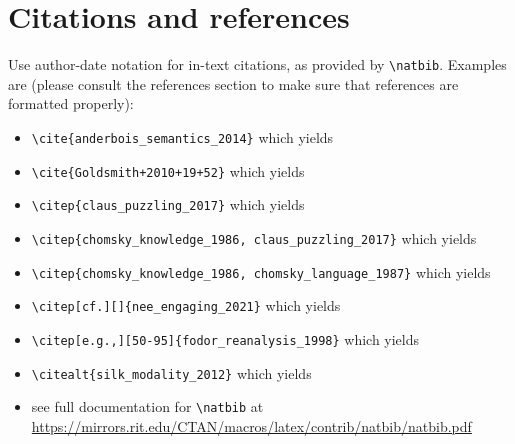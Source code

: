 \documentclass[12pt,letterpaper]{article}
\begin{document}
\section{Citations and references} Use author-date notation for in-text citations, as provided by \verb=\natbib=. Examples are (please consult the references section to make sure that references are formatted properly):
\begin{itemize}
    \item \verb=\cite{anderbois_semantics_2014}= which yields \cite{anderbois_semantics_2014}
    \item \verb=\cite{Goldsmith+2010+19+52}= which yields
    \cite{Goldsmith+2010+19+52}
    \item \verb=\citep{claus_puzzling_2017}= which yields \citep{claus_puzzling_2017}
    \item \verb=\citep{chomsky_knowledge_1986, claus_puzzling_2017}= which yields \citep{chomsky_knowledge_1986, claus_puzzling_2017}
    \item \verb=\citep{chomsky_knowledge_1986, chomsky_language_1987}= which yields \citep{chomsky_knowledge_1986, chomsky_language_1987}
    \item \verb=\citep[cf.][]{nee_engaging_2021}= which yields \citep[cf.][]{nee_engaging_2021}
    \item \verb=\citep[e.g.,][50-95]{fodor_reanalysis_1998}= which yields \citep[e.g.,][50-95]{fodor_reanalysis_1998}
    \item \verb=\citealt{silk_modality_2012}= which yields \citealt{silk_modality_2012}
    \item see full documentation for \verb=\natbib= at\\ \href{https://mirrors.rit.edu/CTAN/macros/latex/contrib/natbib/natbib.pdf}{https://mirrors.rit.edu/CTAN/macros/latex/contrib/natbib/natbib.pdf}
\end{itemize}
\end{document}

